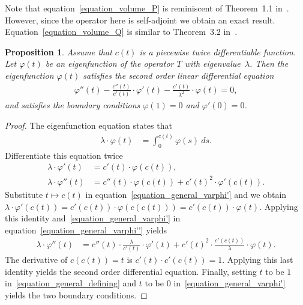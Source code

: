 \documentclass[11pt,reqno]{amsart}
\newtheorem{proposition}[lemma]{Proposition}
\theoremstyle{definition}
\numberwithin{equation}{section}
\begin{document}
Note that equation~\eqref{equation_volume_P}
is reminiscent of Theorem~1.1
in~\cite{Ehrenborg_Kitaev_Perry}.
However, since the operator here is self-adjoint
we obtain an exact result.
Equation~\eqref{equation_volume_Q}
is similar to Theorem~3.2 in~\cite{Ehrenborg}.

\begin{proposition}
Assume that $c(t)$ is a piecewise twice differentiable function.
Let $\varphi(t)$ be an eigenfunction
of the operator $T$ with eigenvalue~$\lambda$.
Then the eigenfunction $\varphi(t)$ satisfies
the second order linear differential equation
\begin{align*}
\varphi''(t)
-
\frac{c''(t)}{c'(t)} \cdot \varphi'(t)
-
\frac{c'(t)}{\lambda^{2}} \cdot \varphi(t)
=
0,
\end{align*}
and satisfies the boundary conditions
$\varphi(1) = 0$ and $\varphi'(0) = 0$.
\label{proposition_general_2nd_order}
\end{proposition}
\begin{proof}
The eigenfunction equation states that
\begin{align}
\lambda \cdot \varphi(t)
& =
\int_{0}^{c(t)} \varphi(s) \: ds .
\label{equation_general_defining}
\end{align}
Differentiate this equation twice
\begin{align}
\lambda \cdot \varphi'(t)
& =
c'(t) \cdot \varphi(c(t)) , 
\label{equation_general_varphi'} \\
\lambda \cdot \varphi''(t)
& =
c''(t) \cdot \varphi(c(t))
+
c'(t)^{2} \cdot \varphi'(c(t)) .
\label{equation_general_varphi''}
\end{align}
Substitute $t \longmapsto c(t)$ in
equation~\eqref{equation_general_varphi'}
and we obtain
$\lambda \cdot \varphi'(c(t))
= c'(c(t)) \cdot \varphi(c(c(t)))
= c'(c(t)) \cdot \varphi(t)$.
Applying this identity and~\eqref{equation_general_varphi'}
in equation~\eqref{equation_general_varphi''} yields
\begin{align*}
\lambda \cdot \varphi''(t)
& =
c''(t) \cdot \frac{\lambda}{c'(t)} \cdot \varphi'(t)
+
c'(t)^{2} \cdot \frac{c'(c(t))}{\lambda} \cdot \varphi(t) .
\end{align*}
The derivative of $c(c(t)) = t$ is $c'(t) \cdot c'(c(t)) = 1$.
Applying this last identity yields the second order
differential equation.
Finally, setting $t$ to be $1$
in~\eqref{equation_general_defining}
and $t$ to be $0$ in~\eqref{equation_general_varphi'}
yields the two boundary conditions.
\end{proof}
\end{document}

